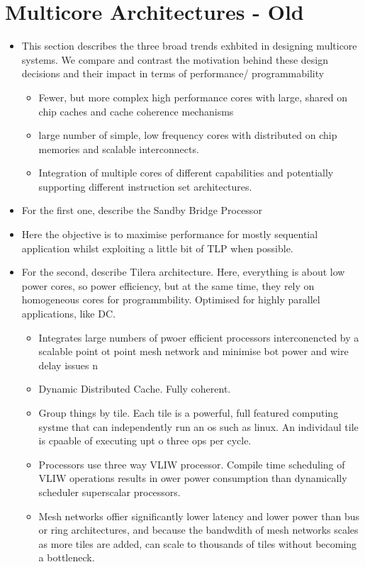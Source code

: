 \section{Multicore Architectures - Old}
\begin{itemize}
\item This section describes the three broad trends exhbited in designing
multicore systems. We compare and contrast the motivation
behind these design decisions and their impact in terms of performance/
programmability  
\begin{itemize}
\item Fewer, but more complex high performance cores with large,
shared on chip caches and cache coherence mechanisms
\item large number of simple, low frequency cores with distributed on chip
memories and scalable interconnects.
\item Integration of multiple cores of different capabilities and 
potentially supporting different instruction set architectures. 
\end{itemize}
\item For the first one, describe the Sandby Bridge Processor
\item Here the objective is to maximise performance for mostly sequential application
whilst exploiting a little bit of TLP when possible. 
\item For the second, describe Tilera architecture. Here, everything is about
low power cores, so power efficiency, but at the same time, they rely on 
homogeneous cores for programmbility. Optimised for highly parallel
applications, like DC. 
\begin{itemize}
\item Integrates large numbers of pwoer efficient processors interconencted by a scalable 
point ot point mesh network and minimise bot power and wire  delay issues
n\item Dynamic Distributed Cache. Fully coherent. 
\item Group things by tile. Each tile is a powerful, full featured computing systme 
that can independently run an os such as linux. 
An individaul tile is cpaable of executing upt o three ops per cycle. 
\item Processors use three way VLIW processor. Compile time scheduling of VLIW operations results in 
ower power consumption than dynamically scheduler superscalar processors. 
\item Mesh networks offier significantly lower latency and lower power than bus
or ring architectures, and because the bandwdith of mesh networks
scales as more tiles are added, can scale to thousands of tiles without 
becoming a bottleneck.


\end{itemize}
\end{itemize}
